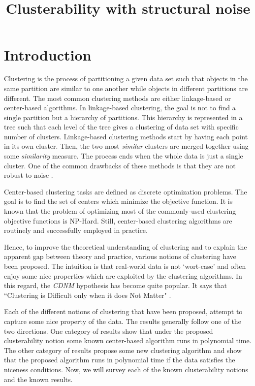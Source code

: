 \documentclass[twoside]{article}
\title{\LARGE Clusterability with structural noise}
\author{}
\begin{document}
\maketitle


\begin{abstract}
\end{abstract}
\section{Introduction}
Clustering is the process of partitioning a given data set such that objects in the same partition are similar to one another while objects in different partitions are different. The most common clustering methods are either linkage-based or center-based algorithms. In linkage-based clustering, the goal is not to find a single partition but a hierarchy of partitions. This hierarchy is represented in a tree such that each level of the tree gives a clustering of data set with specific number of clusters. Linkage-based clustering methods start by having each point in its own cluster. Then, the two most \emph{similar} clusters are merged together using some \emph{similarity} measure. The process ends when the whole data is just a single cluster. One of the common drawbacks of these methods is that they are not robust to noise \cite{narasimhan2005q}. 

Center-based clustering tasks are defined as discrete optimization problems. The goal is to find the set of centers which minimize the objective function. It is known that the problem of optimizing most of the commonly-used clustering objective functions is NP-Hard. Still, center-based clustering algorithms are routinely and successfully employed in practice.

Hence, to improve the theoretical understanding of clustering and to explain the apparent gap between theory and practice, various notions of clustering have been proposed. The intuition is that real-world data is not `wort-case' and often enjoy some nice properties which are exploited by the clustering algorithms. In this regard, the \emph{CDNM} hypothesis has become quite popular. It says that ``Clustering is Difficult only when it does Not Matter" \cite{daniely2012clustering}.    

Each of the different notions of clustering that have been proposed, attempt to capture some nice property of the data. The results generally follow one of the two directions. One category of results show that under the proposed clusterability notion some known center-based algorithm runs in polynomial time. The other category of results propose some new clustering algorithm and show that the proposed algorithm runs in polynomial time if the data satisfies the niceness conditions. Now, we will survey each of the known clusterability notions and the known results.
\end{document}
